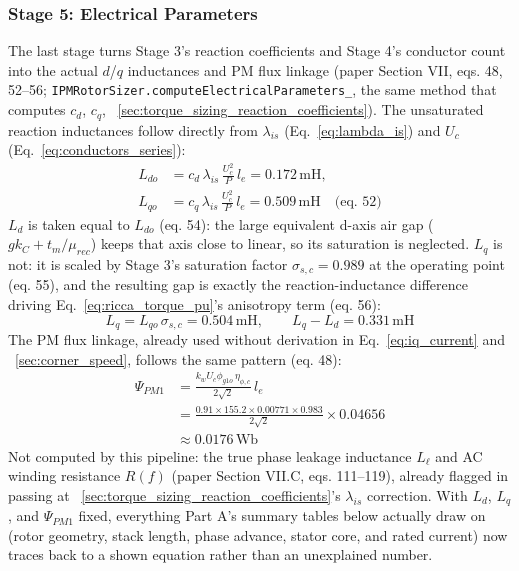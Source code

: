 \documentclass[10pt,final,journal,a4paper,oneside,twocolumn]{IEEEtran}
\begin{document}
\subsubsection{Stage 5: Electrical Parameters}
\label{sec:electrical_parameters}
The last stage turns Stage 3's reaction coefficients and Stage 4's conductor count into the actual $d$/$q$ inductances and PM flux linkage (paper Section VII, eqs. 48, 52--56; \texttt{IPMRotorSizer.\allowbreak computeElectricalParameters\_}, the same method that computes $c_d$, $c_q$, \sectionname~\ref{sec:torque_sizing_reaction_coefficients}). The unsaturated reaction inductances follow directly from $\lambda_{is}$ (Eq.~\ref{eq:lambda_is}) and $U_c$ (Eq.~\ref{eq:conductors_series}):
\begin{equation}
\label{eq:ldo_lqo}
\begin{aligned}
L_{do} &= c_d\,\lambda_{is}\,\frac{U_c^2}{P}\,l_e = 0.172\,\text{mH}, \\
L_{qo} &= c_q\,\lambda_{is}\,\frac{U_c^2}{P}\,l_e = 0.509\,\text{mH} \quad\text{(eq. 52)}
\end{aligned}
\end{equation}
$L_d$ is taken equal to $L_{do}$ (eq. 54): the large equivalent d-axis air gap ($gk_C+t_m/\mu_{rec}$) keeps that axis close to linear, so its saturation is neglected. $L_q$ is not: it is scaled by Stage 3's saturation factor $\sigma_{s,c}=0.989$ at the operating point (eq. 55), and the resulting gap is exactly the reaction-inductance difference driving Eq.~\ref{eq:ricca_torque_pu}'s anisotropy term (eq. 56):
\begin{equation}
\label{eq:lq_final}
L_q = L_{qo}\,\sigma_{s,c} = 0.504\,\text{mH}, \qquad L_q - L_d = 0.331\,\text{mH}
\end{equation}
The PM flux linkage, already used without derivation in Eq.~\ref{eq:iq_current} and \sectionname~\ref{sec:corner_speed}, follows the same pattern (eq. 48):
\begin{equation}
\label{eq:psipm1}
\begin{split}
\Psi_{PM1} &= \frac{k_w U_c \phi_{g1o}\,\eta_{\phi,c}}{2\sqrt2}\,l_e \\
&= \frac{0.91\times155.2\times0.00771\times0.983}{2\sqrt2}\times0.04656 \\
&\approx 0.0176\,\text{Wb}
\end{split}
\end{equation}
Not computed by this pipeline: the true phase leakage inductance $L_\ell$ and AC winding resistance $R(f)$ (paper Section VII.C, eqs. 111--119), already flagged in passing at \sectionname~\ref{sec:torque_sizing_reaction_coefficients}'s $\lambda_{is}$ correction. With $L_d$, $L_q$, and $\Psi_{PM1}$ fixed, everything Part A's summary tables below actually draw on (rotor geometry, stack length, phase advance, stator core, and rated current) now traces back to a shown equation rather than an unexplained number.
\end{document}
